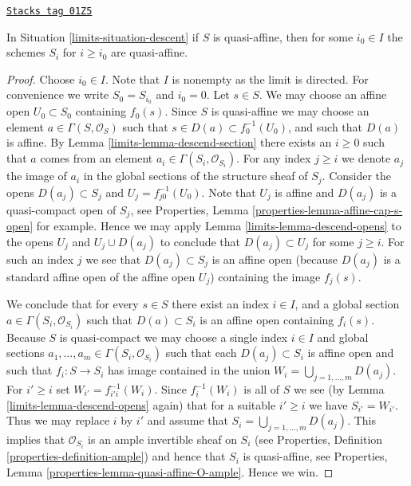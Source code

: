 \begin{lemma}
\label{limits-lemma-limit-quasi-affine}
\href{https://stacks.math.columbia.edu/tag/01Z5}{\texttt{Stacks tag 01Z5}}

In Situation \ref{limits-situation-descent} if $S$ is quasi-affine, then
for some $i_0 \in I$ the schemes $S_i$ for $i \geq i_0$ are quasi-affine.
\end{lemma}

\begin{proof}

Choose $i_0 \in I$. Note that $I$ is nonempty as the limit is directed.
For convenience we write $S_0 = S_{i_0}$ and $i_0 = 0$.
Let $s \in S$. We may choose an affine open
$U_0 \subset S_0$ containing $f_0(s)$. Since $S$ is quasi-affine
we may choose an element $a \in \Gamma(S, \mathcal{O}_S)$ such
that $s \in D(a) \subset f_0^{-1}(U_0)$, and such that
$D(a)$ is affine. By Lemma \ref{limits-lemma-descend-section}
there exists an $i \geq 0$ such that $a$
comes from an element $a_i \in \Gamma(S_i, \mathcal{O}_{S_i})$.
For any index $j \geq i$ we denote $a_j$
the image of $a_i$ in the global sections of the
structure sheaf of $S_j$.
Consider the opens $D(a_j) \subset S_j$
and $U_j = f_{j0}^{-1}(U_0)$. Note that
$U_j$ is affine and $D(a_j)$ is a quasi-compact open of $S_j$,
see Properties, Lemma \ref{properties-lemma-affine-cap-s-open}
for example. Hence we may apply Lemma \ref{limits-lemma-descend-opens} to the opens
$U_j$ and $U_j \cup D(a_j)$ to conclude that
$D(a_j) \subset U_j$ for some  $j \geq i$.
For such an index $j$ we see that $D(a_j) \subset S_j$ is an affine open
(because $D(a_j)$ is a standard affine open of the affine open $U_j$)
containing the image $f_j(s)$.

\medskip\noindent
We conclude that for every $s \in S$ there exist
an index $i \in I$, and a global section
$a \in \Gamma(S_i, \mathcal{O}_{S_i})$
such that $D(a) \subset S_i$ is an affine open
containing $f_i(s)$. Because $S$ is quasi-compact we
may choose a single index $i \in I$ and global sections
$a_1, \ldots, a_m \in \Gamma(S_i, \mathcal{O}_{S_i})$
such that each $D(a_j) \subset S_i$ is affine open
and such that $f_i : S \to S_i$ has image contained
in the union $W_i = \bigcup_{j = 1, \ldots, m} D(a_j)$.
For $i' \geq i$ set $W_{i'} = f_{i'i}^{-1}(W_i)$.
Since $f_i^{-1}(W_i)$ is all of $S$ we see
(by Lemma \ref{limits-lemma-descend-opens} again)
that for a suitable $i' \geq i$ we
have $S_{i'} = W_{i'}$. Thus we may replace $i$ by
$i'$ and assume that $S_i = \bigcup_{j = 1, \ldots, m} D(a_j)$.
This implies that $\mathcal{O}_{S_i}$ is an ample invertible
sheaf on $S_i$ (see Properties, Definition \ref{properties-definition-ample})
and hence that $S_i$ is quasi-affine, see
Properties, Lemma \ref{properties-lemma-quasi-affine-O-ample}.
Hence we win.
\end{proof}

